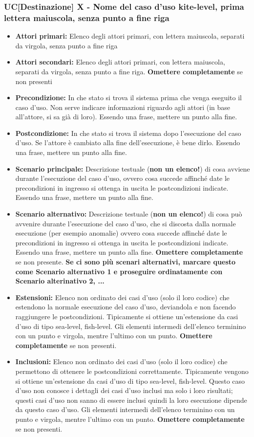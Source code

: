 \documentclass[a4paper, oneside]{article} %
\begin{document}
\subsubsection{UC[Destinazione] X - Nome del caso d'uso kite-level, prima lettera maiuscola, senza punto a fine riga} %
\begin{itemize}
\item \textbf{Attori primari:} Elenco degli attori primari, con lettera maiuscola, separati da virgola, senza punto a fine riga
\item \textbf{Attori secondari:} Elenco degli attori primari, con lettera maiuscola, separati da virgola, senza punto a fine riga. \textbf{Omettere completamente} se non presenti
\item \textbf{Precondizione:} In che stato si trova il sistema prima che venga eseguito il caso d'uso. Non serve indicare informazioni riguardo agli attori (in base all'attore, si sa già di loro). Essendo una frase, mettere un punto alla fine.
\item \textbf{Postcondizione:} In che stato si trova il sistema dopo l'esecuzione del caso d'uso. Se l'attore è cambiato alla fine dell'esecuzione, è bene dirlo. Essendo una frase, mettere un punto alla fine.
\item \textbf{Scenario principale:} Descrizione testuale (\textbf{non un elenco!}) di cosa avviene durante l'esecuzione del caso d'uso, ovvero cosa succede affinché date le precondizioni in ingresso si ottenga in uscita le postcondizioni indicate. Essendo una frase, mettere un punto alla fine.
\item \textbf{Scenario alternativo:} Descrizione testuale (\textbf{non un elenco!}) di cosa può avvenire durante l'esecuzione del caso d'uso, che si discosta dalla normale esecuzione (per esempio anomalie) ovvero cosa succede affinché date le precondizioni in ingresso si ottenga in uscita le postcondizioni indicate. Essendo una frase, mettere un punto alla fine. \textbf{Omettere completamente} se non presente. \textbf{Se ci sono più scenari alternativi, marcare questo come Scenario alternativo 1 e proseguire ordinatamente con Scenario alterinativo 2, ...}
\item \textbf{Estensioni:} Elenco non ordinato dei casi d'uso (solo il loro codice) che estendono la normale esecuzione del caso d'uso, deviandola e non facendo raggiungere le postcondizioni. Tipicamente si ottiene un'estensione da casi d'uso di tipo sea-level, fish-level. Gli elementi intermedi dell'elenco terminino con un punto e virgola, mentre l'ultimo con un punto. \textbf{Omettere completamente} se non presenti.
\item \textbf{Inclusioni:} Elenco non ordinato dei casi d'uso (solo il loro codice) che permettono di ottenere le postcondizioni correttamente. Tipicamente vengono si ottiene un'estensione da casi d'uso di tipo sea-level, fish-level. Questo caso d'uso non conosce i dettagli dei casi d'uso inclusi ma solo i loro risultati; questi casi d'uso non sanno di essere inclusi quindi la loro esecuzione dipende da questo caso d'uso. Gli elementi intermedi dell'elenco terminino con un punto e virgola, mentre l'ultimo con un punto. \textbf{Omettere completamente} se non presenti.
\end{itemize}
\end{document}
